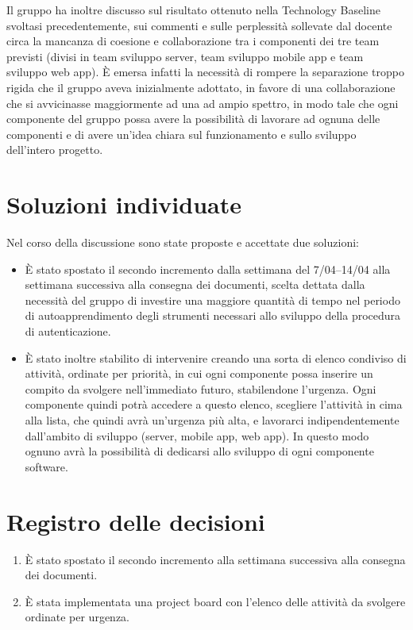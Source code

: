 \documentclass{article}
\begin{document}
Il gruppo ha inoltre discusso sul risultato ottenuto nella Technology Baseline svoltasi precedentemente, sui commenti e sulle perplessità sollevate dal docente circa la mancanza di coesione e collaborazione tra i componenti dei tre team previsti (divisi in team sviluppo server, team sviluppo mobile app e team sviluppo web app).
È emersa infatti la necessità di rompere la separazione troppo rigida che il gruppo aveva inizialmente adottato, in favore di una collaborazione che si avvicinasse maggiormente ad una ad ampio spettro, in modo tale che ogni componente del gruppo possa avere la possibilità di lavorare ad ognuna delle componenti e di avere un'idea chiara sul funzionamento e sullo sviluppo dell'intero progetto.

\section{Soluzioni individuate}%
\label{sec:soluzioni_individuate}

Nel corso della discussione sono state proposte e accettate due soluzioni:
\begin{itemize}
  \item È stato spostato il secondo incremento dalla settimana del 7/04--14/04 alla settimana successiva alla consegna dei documenti, scelta dettata dalla necessità del gruppo di investire una maggiore quantità di tempo nel periodo di autoapprendimento degli strumenti necessari allo sviluppo della procedura di autenticazione.
  \item È stato inoltre stabilito di intervenire creando una sorta di elenco condiviso di attività, ordinate per priorità, in cui ogni componente possa inserire un compito da svolgere nell'immediato futuro, stabilendone l'urgenza. Ogni componente quindi potrà accedere a questo elenco, scegliere l'attività in cima alla lista, che quindi avrà un'urgenza più alta, e lavorarci indipendentemente dall'ambito di sviluppo (server, mobile app, web app). In questo modo ognuno avrà la possibilità di dedicarsi allo sviluppo di ogni componente software.
\end{itemize}

\newpage
\section{Registro delle decisioni}%
\label{sec:registro_delle_decisioni}

\begin{enumerate}
  \item È stato spostato il secondo incremento alla settimana successiva alla consegna dei documenti.
  \item È stata implementata una project board con l'elenco delle attività da svolgere ordinate per urgenza.
\end{enumerate}

\end{document}
